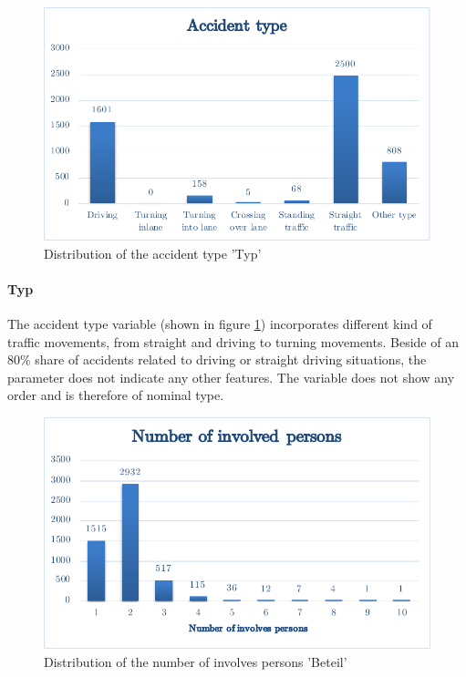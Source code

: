 \documentclass[a4paper,12pt]{report}
\begin{document}
\begin{figure}[h]
	\centering
	\includegraphics[scale=0.6]{./assets/baysis_dataset_Typ.pdf}
	\caption{Distribution of the accident type 'Typ'}
	\label{img:baysis_dataset_Typ}
\end{figure}

\paragraph{Typ}
The accident type variable (shown in figure \ref{img:baysis_dataset_Typ}) incorporates different kind of traffic movements, from straight and driving to turning movements. Beside of an 80\% share of accidents related to driving or straight driving situations, the parameter does not indicate any other features. The variable does not show any order and is therefore of nominal type.

\begin{figure}[H]
	\centering
	\includegraphics[scale=0.6]{./assets/baysis_dataset_Beteil.pdf}
	\caption{Distribution of the number of involves persons 'Beteil'}
	\label{img:baysis_dataset_Beteil}
\end{figure}
\end{document}
